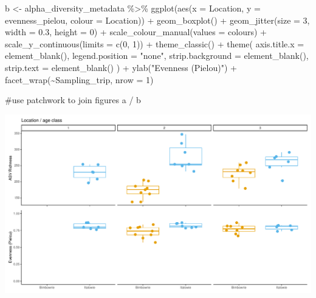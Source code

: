 \documentclass[
  letterpaper,
  DIV=11,
  numbers=noendperiod]{scrartcl}
\newenvironment{Shaded}{\begin{snugshade}}{\end{snugshade}}
\newcommand{\AttributeTok}[1]{\textcolor[rgb]{0.40,0.45,0.13}{#1}}
\newcommand{\CommentTok}[1]{\textcolor[rgb]{0.37,0.37,0.37}{#1}}
\newcommand{\DecValTok}[1]{\textcolor[rgb]{0.68,0.00,0.00}{#1}}
\newcommand{\FloatTok}[1]{\textcolor[rgb]{0.68,0.00,0.00}{#1}}
\newcommand{\FunctionTok}[1]{\textcolor[rgb]{0.28,0.35,0.67}{#1}}
\newcommand{\NormalTok}[1]{\textcolor[rgb]{0.00,0.23,0.31}{#1}}
\newcommand{\OtherTok}[1]{\textcolor[rgb]{0.00,0.23,0.31}{#1}}
\newcommand{\SpecialCharTok}[1]{\textcolor[rgb]{0.37,0.37,0.37}{#1}}
\newcommand{\StringTok}[1]{\textcolor[rgb]{0.13,0.47,0.30}{#1}}
\begin{document}
\begin{Shaded}
\begin{Highlighting}[]
\NormalTok{b }\OtherTok{\textless{}{-}}\NormalTok{ alpha\_diversity\_metadata }\SpecialCharTok{\%\textgreater{}\%}
  \FunctionTok{ggplot}\NormalTok{(}\FunctionTok{aes}\NormalTok{(}\AttributeTok{x =}\NormalTok{ Location, }\AttributeTok{y =}\NormalTok{ evenness\_pielou, }\AttributeTok{colour =}\NormalTok{ Location)) }\SpecialCharTok{+}
  \FunctionTok{geom\_boxplot}\NormalTok{() }\SpecialCharTok{+}
  \FunctionTok{geom\_jitter}\NormalTok{(}\AttributeTok{size =} \DecValTok{3}\NormalTok{, }\AttributeTok{width =} \FloatTok{0.3}\NormalTok{, }\AttributeTok{height =} \DecValTok{0}\NormalTok{) }\SpecialCharTok{+}
  \FunctionTok{scale\_colour\_manual}\NormalTok{(}\AttributeTok{values =}\NormalTok{ colours) }\SpecialCharTok{+}
  \FunctionTok{scale\_y\_continuous}\NormalTok{(}\AttributeTok{limits =} \FunctionTok{c}\NormalTok{(}\DecValTok{0}\NormalTok{, }\DecValTok{1}\NormalTok{)) }\SpecialCharTok{+}
  \FunctionTok{theme\_classic}\NormalTok{() }\SpecialCharTok{+}
  \FunctionTok{theme}\NormalTok{(}
    \AttributeTok{axis.title.x =} \FunctionTok{element\_blank}\NormalTok{(),}
    \AttributeTok{legend.position =} \StringTok{"none"}\NormalTok{,}
    \AttributeTok{strip.background =} \FunctionTok{element\_blank}\NormalTok{(),}
    \AttributeTok{strip.text =} \FunctionTok{element\_blank}\NormalTok{()}
\NormalTok{    ) }\SpecialCharTok{+}
  \FunctionTok{ylab}\NormalTok{(}\StringTok{"Evenness (Pielou)"}\NormalTok{) }\SpecialCharTok{+}
  \FunctionTok{facet\_wrap}\NormalTok{(}\SpecialCharTok{\textasciitilde{}}\NormalTok{Sampling\_trip, }\AttributeTok{nrow =} \DecValTok{1}\NormalTok{)}

\CommentTok{\#use patchwork to join figures}
\NormalTok{a }\SpecialCharTok{/}\NormalTok{ b}
\end{Highlighting}
\end{Shaded}

\includegraphics{code_files/figure-pdf/unnamed-chunk-3-1.pdf}
\end{document}
